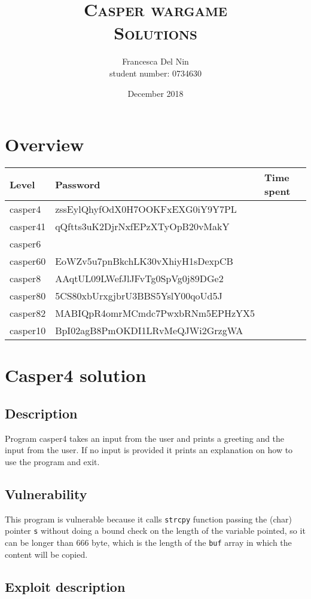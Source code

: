 \documentclass[a4paper,12pt]{article}
\title{\scshape Casper wargame \\ Solutions}
\author{Francesca Del Nin \\ student number: 0734630}
\date{December 2018}
\begin{document}
\maketitle


\section{Overview}
\begin{table}[]
\begin{tabular}{lll}
 Level & Password & Time spent  \\
 \hline
 casper4 & zssEylQhyfOdX0H7OOKFxEXG0iY9Y7PL &   \\
 casper41 & qQftts3uK2DjrNxfEPzXTyOpB20vMakY &   \\
 casper6 &  &  \\
 casper60 & EoWZv5u7pnBkchLK30vXhiyH1sDexpCB & \\
 casper8 & AAqtUL09LWefJlJFvTg0SpVg0j89DGe2 & \\
 casper80 & 5CS80xbUrxgjbrU3BBS5YslY00qoUd5J & \\
 casper82 & MABIQpR4omrMCmdc7PwxbRNm5EPHzYX5 & \\
 casper10 & BpI02agB8PmOKDI1LRvMeQJWi2GrzgWA &\\
\end{tabular}
\end{table}

\newpage
\section{Casper4 solution}
\subsection{Description}
Program casper4 takes an input from the user and prints a greeting and the input from the user. If no input is provided it prints an explanation on how to use the program and exit.
 

\subsection{Vulnerability}

This program is vulnerable because it calls \texttt{strcpy} function passing the (char) pointer \texttt{s} without doing a bound check on the length of the variable pointed, so it can be longer than 666 byte, which is the length of the \texttt{buf} array in which the content will be copied.

\subsection{Exploit description}
\end{document}
